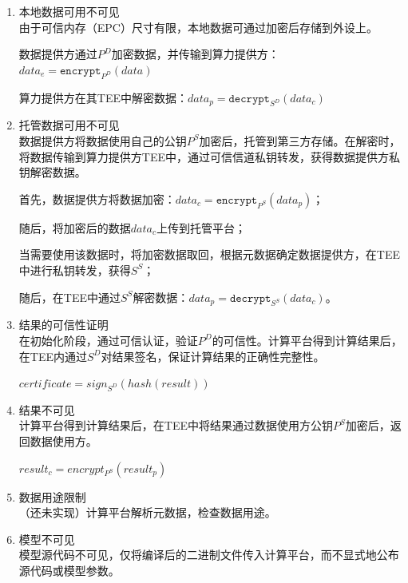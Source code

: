 \begin{enumerate}
    \item 本地数据可用不可见\\
    由于可信内存（EPC）尺寸有限，本地数据可通过加密后存储到外设上。

    数据提供方通过$P^D$加密数据，并传输到算力提供方：$data_e = \texttt{encrypt}_{P^D}(data)$

    算力提供方在其TEE中解密数据：$data_p = \texttt{decrypt}_{S^D}(data_c)$

    \item 托管数据可用不可见\\
    数据提供方将数据使用自己的公钥$P^S$加密后，托管到第三方存储。在解密时，将数据传输到算力提供方TEE中，通过可信信道私钥转发，获得数据提供方私钥解密数据。

    首先，数据提供方将数据加密：$data_c = \texttt{encrypt}_{P^S}(data_p)$；

    随后，将加密后的数据$data_c$上传到托管平台；

    当需要使用该数据时，将加密数据取回，根据元数据确定数据提供方，在TEE中进行私钥转发，获得$S^S$；
    
    随后，在TEE中通过$S^S$解密数据：$data_p = \texttt{decrypt}_{S^S}(data_c)$。

    \item 结果的可信性证明\\ 
    在初始化阶段，通过可信认证，验证$P^D$的可信性。计算平台得到计算结果后，在TEE内通过$S^D$对结果签名，保证计算结果的正确性完整性。

    $certificate = sign_{S^D}(hash(result))$

    \item 结果不可见\\ 
    计算平台得到计算结果后，在TEE中将结果通过数据使用方公钥$P^S$加密后，返回数据使用方。

    $result_c = encrypt_{P^S}(result_p)$

    \item 数据用途限制\\ 
    （还未实现）计算平台解析元数据，检查数据用途。


    \item 模型不可见\\ 
    模型源代码不可见，仅将编译后的二进制文件传入计算平台，而不显式地公布源代码或模型参数。


\end{enumerate}
